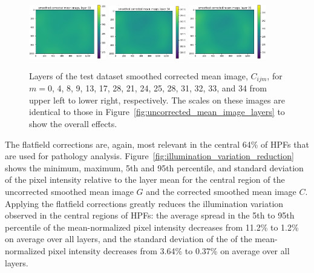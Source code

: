 \documentclass[letterpaper,11pt]{article}
\newcommand{\reffig}[1]{Figure~\ref{#1}}
\begin{document}
\begin{figure}[!ht]
\includegraphics[width=0.3\textwidth]{images/results/smoothed_corrected_mean_image_layers/smoothed_corrected_mean_image_layer_33_same_scale}
\includegraphics[width=0.3\textwidth]{images/results/smoothed_corrected_mean_image_layers/smoothed_corrected_mean_image_layer_34_same_scale}
\includegraphics[width=0.3\textwidth]{images/results/smoothed_corrected_mean_image_layers/smoothed_corrected_mean_image_layer_35_same_scale}
\caption{\footnotesize Layers of the test dataset smoothed corrected mean image, $C_{ijm}$, for $m=$0, 4, 8, 9, 13, 17, 28, 21, 24, 25, 28, 31, 32, 33, and 34 from upper left to lower right, respectively. The scales on these images are identical to those in \reffig{fig:uncorrected_mean_image_layers} to show the overall effects.}
\label{fig:corrected_smoothed_mean_image_layers_same_scale}
\end{figure}

The flatfield corrections are, again, most relevant in the central 64\% of HPFs that are used for pathology analysis. \reffig{fig:illumination_variation_reduction} shows the minimum, maximum, 5th and 95th percentile, and standard deviation of the pixel intensity relative to the layer mean for the central region of the uncorrected smoothed mean image $G$ and the corrected smoothed mean image $C$. Applying the flatfield corrections greatly reduces the illumination variation observed in the central regions of HPFs: the average spread in the 5th to 95th percentile of the mean-normalized pixel intensity decreases from 11.2\% to 1.2\% on average over all layers, and the standard deviation of the of the mean-normalized pixel intensity decreases from 3.64\% to 0.37\% on average over all layers.
\end{document}
